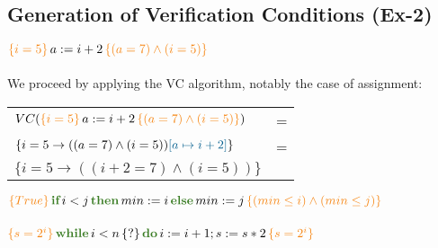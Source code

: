 \documentclass[11pt]{article}
\newcommand{\kw}[1]{{\color{OliveGreen}{#1}}}
\newcommand{\hblue}[1]{{\color{MidnightBlue}{#1}}}
\newcommand{\hoaret}[3]{{\color{BurntOrange}{\{#1\}}}\,#2\,{\color{BurntOrange}{\{#3\}}}}
\begin{document}
\subsection*{Generation of Verification Conditions (Ex-2)}

 $\hoaret{i = 5}{a := i + 2}{(a = 7) \land (i = 5)}$\\\vspace{0.3cm}\\
We proceed by applying the VC algorithm, notably the case of assignment:\\

\begin{tabular}{ll}
$VC(\hoaret{i = 5}{a := i + 2}{(a = 7) \land (i = 5)})$ & =\\
$\{i = 5 \to ((a = 7) \land (i = 5))\hblue{[a \mapsto i + 2]}\}$ & =\\
$\{i = 5 \to ((i+2=7) \land (i=5))\}$
  
\end{tabular}





 $\hoaret{True}{\textbf{\kw{if}}\,i<j\,\textbf{\kw{then}}\,min := i\,\textbf{\kw{else}}\,min := j}{(min \leq i) \land (min \leq j)}$\\\vspace{0.3cm}\\
 $\hoaret{s = 2^i}{\textbf{\kw{while}}\,i<n\,\{?\}\,\textbf{\kw{do}}\,i := i +1 ;s := s*2}{s = 2^i}$\\\vspace{0.3cm}\\
\end{document}
